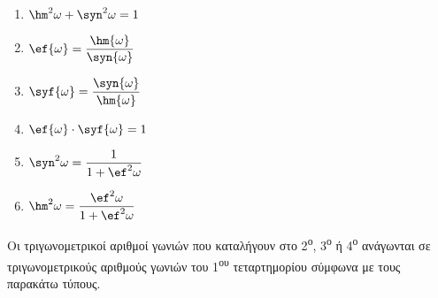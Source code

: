 \documentclass[twoside,nofonts,internet,shmeiwseis]{thewria}
\newcommand{\tss}[1]{\textsuperscript{#1}}
\begin{document}
\begin{multicols}{3}
\begin{enumerate}[itemsep=0mm]
\item $ \hm^2{\omega}+\syn^2{\omega}=1 $
\item $ \ef{\omega}={\dfrac{\hm{\omega}}{\syn{\omega}}} $
\item $ \syf{\omega}={\dfrac{\syn{\omega}}{\hm{\omega}}} $
\item $ \ef{\omega}\cdot\syf{\omega}=1 $
\item $ \syn^2{\omega}=\dfrac{1}{1+\ef^2{\omega}} $
\item $ \hm^2{\omega}=\dfrac{\ef^2{\omega}}{1+\ef^2{\omega}} $
\end{enumerate}
\end{multicols}
\label{th:an_tet}
Οι τριγωνομετρικοί αριθμοί γωνιών που καταλήγουν στο 2\tss{ο}, 3\tss{ο} ή 4\tss{ο} ανάγωνται σε τριγωνομετρικούς αριθμούς γωνιών του 1\textsuperscript{ου} τεταρτημορίου σύμφωνα με τους παρακάτω τύπους.
\end{document}
